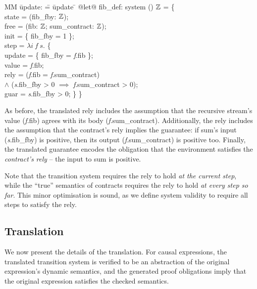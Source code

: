   \begin{tabbing}
  MM \= update: \= = \= update \= \kill
  @let@ fib_def: system () $\mathbb{Z}$ = \{ \\
  \> state   \> = (fib_fby: $\mathbb{Z}$); \\
  \> free  \> = (fib: $\mathbb{Z}$; sum_contract: $\mathbb{Z}$); \\
  \> init  \> = \{ fib_fby = 1 \}; \\
  \> step  \> = $\lambda{} i~f~s.$ \{ \\
  \> \> \> update \> = \{ fib_fby = \textit{f}.fib \}; \\
  \> \> \> value  \> = \textit{f}.fib; \\
  \> \> \> rely   \> = (\textit{f}.fib = \textit{f}.sum_contract) \\
  \> \> \>        \> $\wedge$ (\textit{s}.fib_fby > 0 $\implies$ \textit{f}.sum_contract > 0); \\
  \> \> \> guar   \> = \textit{s}.fib_fby > 0; \} \}
  \end{tabbing}

As before, the translated rely includes the assumption that the recursive stream's value (\textit{f}.fib) agrees with its body (\textit{f}.sum_contract).
Additionally, the rely includes the assumption that the contract's rely implies the guarantee: if sum's input (\textit{s}.fib_fby) is positive, then its output (\textit{f}.sum_contract) is positive too.
Finally, the translated guarantee encodes the obligation that the environment satisfies the \emph{contract's rely} -- the input to sum is positive.

Note that the transition system requires the rely to hold \emph{at the current step}, while the ``true'' semantics of contracts requires the rely to hold \emph{at every step so far}.
This minor optimisation is sound, as we define system validity to require all steps to satisfy the rely.

\subsection{Translation}

We now present the details of the translation.
For causal expressions, the translated transition system is verified to be an abstraction of the original expression's dynamic semantics, and the generated proof obligations imply that the original expression satisfies the checked semantics.


